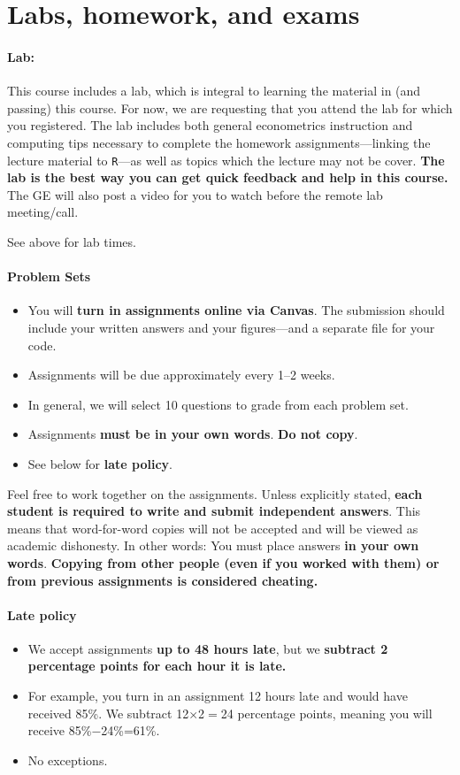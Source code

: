 \documentclass[10pt]{article}
\begin{document}
\section*{Labs, homework, and exams}

\paragraph{Lab:} This course includes a lab, which is integral to learning the material in (and passing) this course. For now, we are requesting that you attend the lab for which you registered. The lab includes both general econometrics instruction and computing tips necessary to complete the homework assignments---linking the lecture material to \texttt{R}---as well as topics which the lecture may not be cover. \textbf{The lab is the best way you can get quick feedback and help in this course.} The GE will also post a video for you to watch before the remote lab meeting/call.

See above for lab times.

\paragraph{Problem Sets}
\begin{itemize}
  \item You will \textbf{turn in assignments online via Canvas}. The submission should include your written answers and your figures---and a separate file for your code.
  \item Assignments will be due approximately every 1--2 weeks.
  \item In general, we will select 10 questions to grade from each problem set.
  \item Assignments \textbf{must be in your own words}. \textbf{Do not copy}.
  \item See below for \textbf{late policy}.
\end{itemize}
Feel free to work together on the assignments. Unless explicitly stated, \textbf{each student is required to write and submit independent answers}. This means that word-for-word copies will not be accepted and will be viewed as academic dishonesty. In other words: You must place answers \textbf{in your own words}. \textbf{Copying from other people (even if you worked with them) or from previous assignments is considered cheating.}

\paragraph{Late policy}
\begin{itemize}
  \item We accept assignments \textbf{up to 48 hours late}, but we \textbf{subtract 2 percentage points for each hour it is late.}
  \item For example, you turn in an assignment 12 hours late and would have received 85\%. We subtract 12$\times$2$=$24 percentage points, meaning you will receive 85\%$-$24\%=61\%.
  \item No exceptions.
\end{itemize}
\end{document}
